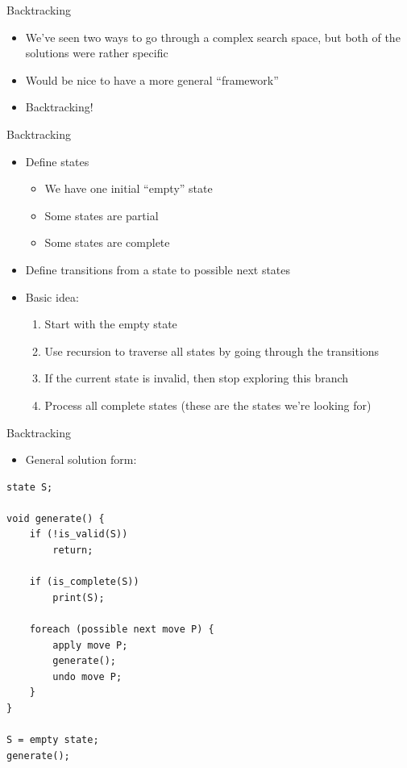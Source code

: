 \documentclass{beamer}
\begin{document}
\begin{frame}{Backtracking}
    \begin{itemize}
        \item We've seen two ways to go through a complex search space, but both of the solutions were rather specific
        \item Would be nice to have a more general ``framework''
        \vspace{10pt}
        \item Backtracking!
    \end{itemize}
\end{frame}

\begin{frame}{Backtracking}
    \begin{itemize}
        \item Define states
            \begin{itemize}
                \item We have one initial ``empty'' state
                \item Some states are partial
                \item Some states are complete
            \end{itemize}
        \vspace{10pt}
        \item Define transitions from a state to possible next states
        \vspace{10pt}
        \item Basic idea:
            \begin{enumerate}
                \item Start with the empty state
                \item Use recursion to traverse all states by going through the transitions
                \item If the current state is invalid, then stop exploring this branch
                \item Process all complete states (these are the states we're looking for)
            \end{enumerate}
    \end{itemize}
\end{frame}


\begin{frame}{Backtracking}
    \begin{itemize}
        \item General solution form:
    \end{itemize}

    \begin{verbatim}
state S;

void generate() {
    if (!is_valid(S))
        return;

    if (is_complete(S))
        print(S);

    foreach (possible next move P) {
        apply move P;
        generate();
        undo move P;
    }
}

S = empty state;
generate();
    \end{verbatim}
\end{frame}
\end{document}
